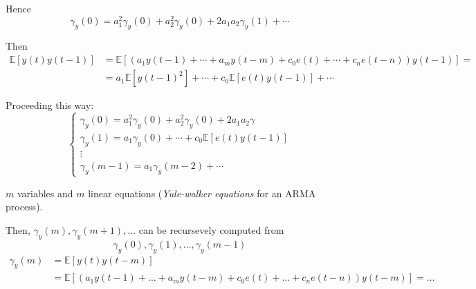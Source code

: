 Hence
$$
\gamma_{y}(0)=a_{1}^{2} \gamma_{y}(0)+a_{2}^{2} \gamma_{y}(0)+2 a_{1} a_{2} \gamma_{y}(1)+\cdots
$$

Then
\begin{align*}
	\mathbb{E}[y(t) y(t-1)]&=\mathbb{E}\left[\left(a_{1} y(t-1)+\cdots+a_{m} y(t-m)+c_{0} e(t)+\cdots+c_{n} e(t-n)\right) y(t-1)\right]= \\
	&=a_{1} \mathbb{E}\left[y(t-1)^{2}\right]+\cdots+c_{0} \mathbb{E}[e(t) y(t-1)]+\cdots
\end{align*}

Proceeding this way:
$$
\begin{cases}
	\gamma_{y}(0)=a_{1}^{2} \gamma_{y}(0)+a_{2}^{2} \gamma_{y}(0)+2 a_{1} a_{2} \gamma \\
	\gamma_{y}(1)=a_{1} \gamma_{y}(0)+\cdots+c_{0} \mathbb{E}[e(t) y(t-1)] \\
	\vdots \\
	\gamma_{y}(m-1)=a_{1} \gamma_{y}(m-2)+\cdots
\end{cases}
$$

$m$ variables and $m$ linear equations (\emph{Yule-walker equations} for an ARMA process).

Then, $\gamma_{y}(m), \gamma_{y}(m+1), \ldots$ can be recursevely computed from
$$
\gamma_{y}(0), \gamma_{y}(1), \ldots, \gamma_{y}(m-1)
$$
\begin{align*}
	\gamma_{y}(m)&=\mathbb{E}[y(t) y(t-m)] \\
	&=\mathbb{E}\left[\left(a_{1} y(t-1)+\ldots+a_{m} y(t-m)+c_{0} e(t)+\ldots+c_{n} e(t-n)\right) y(t-m)\right]=\ldots
\end{align*}